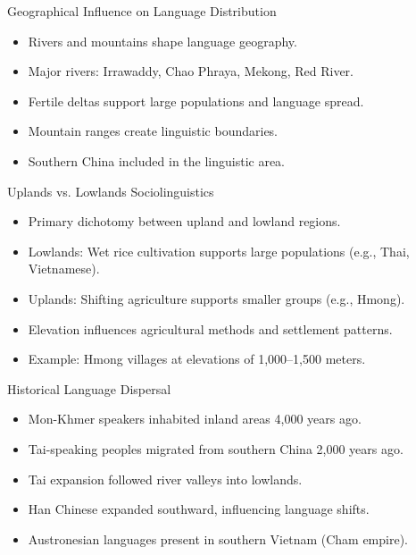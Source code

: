 \documentclass{beamer}
\begin{document}
\begin{frame}{Geographical Influence on Language Distribution}
    \begin{itemize}
        \item Rivers and mountains shape language geography.
        \item Major rivers: Irrawaddy, Chao Phraya, Mekong, Red River.
        \item Fertile deltas support large populations and language spread.
        \item Mountain ranges create linguistic boundaries.
        \item Southern China included in the linguistic area.
    \end{itemize}
\end{frame}

\begin{frame}{Uplands vs. Lowlands Sociolinguistics}
    \begin{itemize}
        \item Primary dichotomy between upland and lowland regions.
        \item Lowlands: Wet rice cultivation supports large populations (e.g., Thai, Vietnamese).
        \item Uplands: Shifting agriculture supports smaller groups (e.g., Hmong).
        \item Elevation influences agricultural methods and settlement patterns.
        \item Example: Hmong villages at elevations of 1,000–1,500 meters.
    \end{itemize}
\end{frame}

\begin{frame}{Historical Language Dispersal}
    \begin{itemize}
        \item Mon-Khmer speakers inhabited inland areas 4,000 years ago.
        \item Tai-speaking peoples migrated from southern China 2,000 years ago.
        \item Tai expansion followed river valleys into lowlands.
        \item Han Chinese expanded southward, influencing language shifts.
        \item Austronesian languages present in southern Vietnam (Cham empire).
    \end{itemize}
\end{frame}
\end{document}
